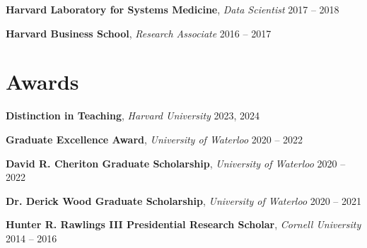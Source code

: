 \documentclass[11pt, letterpaper]{article}
\newcommand{\cventryone}[4]{
  \noindent\textbf{#2}, \textit{#3} \hfill #1 %
  \ifstrempty{#4}{}{ \\ #4 }%
  \par\vspace{2pt} %
}
\begin{document}
\cventryone{2017 -- 2018}
    {Harvard Laboratory for Systems Medicine}
    {Data Scientist}
    {}

\cventryone{2016 -- 2017}
    {Harvard Business School}
    {Research Associate}
    {}

\section{Awards}

\cventryone{2023, 2024}
    {Distinction in Teaching}
    {Harvard University}
    {}

\cventryone{2020 -- 2022}
    {Graduate Excellence Award}
    {University of Waterloo}
    {}

\cventryone{2020 -- 2022}
    {David R. Cheriton Graduate Scholarship}
    {University of Waterloo}
    {}

\cventryone{2020 -- 2021}
    {Dr. Derick Wood Graduate Scholarship}
    {University of Waterloo}
    {}

\cventryone{2014 -- 2016}
    {Hunter R. Rawlings III Presidential Research Scholar}
    {Cornell University}
    {}
\end{document}
